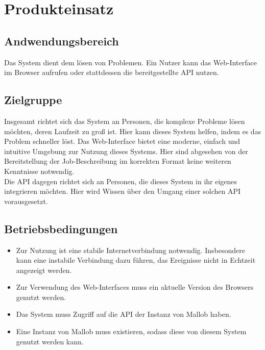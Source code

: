 \section{Produkteinsatz}

\subsection{Andwendungsbereich}

Das System dient dem lösen von Problemen. Ein Nutzer kann das Web-Interface im Browser aufrufen oder stattdessen die bereitgestellte API nutzen.
\subsection{Zielgruppe}

Insgesamt richtet sich das System an Personen, die komplexe Probleme lösen möchten, deren Laufzeit zu groß ist. Hier kann dieses System helfen, indem es das Problem schneller löst. 
Das Web-Interface bietet eine moderne, einfach und intuitive Umgebung zur Nutzung dieses Systems. Hier sind abgesehen von der Bereitstellung der Job-Beschreibung im korrekten Format keine weiteren Kenntnisse notwendig. \\
Die API dagegen richtet sich an Personen, die dieses System in ihr eigenes integrieren möchten. Hier wird Wissen über den Umgang einer solchen API vorausgesetzt. 
\subsection{Betriebsbedingungen}

\begin{itemize}
    \item Zur Nutzung ist eine stabile Internetverbindung notwendig. Insbesondere kann eine instabile Verbindung dazu führen, das Ereignisse nicht in Echtzeit angezeigt werden.
    \item Zur Verwendung des Web-Interfaces muss ein aktuelle Version des Browsers genutzt werden.
    \item Das System muss Zugriff auf die API der Instanz von Mallob haben.
    \item Eine Instanz von Mallob muss existieren, sodass diese von diesem System genutzt werden kann. 
\end{itemize}